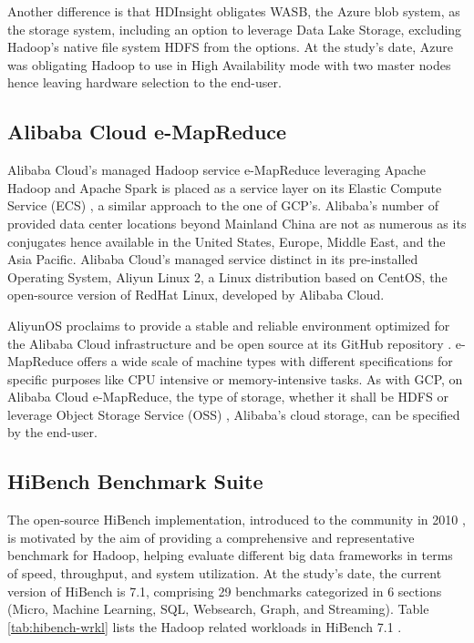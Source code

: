 \documentclass[review]{elsarticle}
\begin{document}
Another difference is that HDInsight obligates WASB, the Azure blob system, as the storage system, including an option to leverage Data Lake Storage, excluding Hadoop's native file system HDFS from the options. At the study's date, Azure was obligating Hadoop to use in High Availability mode with two master nodes hence leaving hardware selection to the end-user.

\subsection{Alibaba Cloud e-MapReduce}\label{Alibaba_eMapReduce}
Alibaba Cloud's managed Hadoop service e-MapReduce leveraging Apache Hadoop and Apache Spark is placed as a service layer on its Elastic Compute Service (ECS) \cite{noauthor_alielastic_nodate}, a similar approach to the one of GCP's. Alibaba's number of provided data center locations beyond Mainland China are not as numerous as its conjugates hence available in the United States, Europe, Middle East, and the Asia Pacific. Alibaba Cloud's managed service distinct in its pre-installed Operating System, Aliyun Linux 2, a Linux distribution based on CentOS, the open-source version of RedHat Linux, developed by Alibaba Cloud. 

AliyunOS proclaims to provide a stable and reliable environment optimized for the Alibaba Cloud infrastructure and be open source at its GitHub repository \cite{noauthor_alibaba_nodate}. e-MapReduce offers a wide scale of machine types with different specifications for specific purposes like CPU intensive or memory-intensive tasks. As with GCP, on Alibaba Cloud e-MapReduce, the type of storage, whether it shall be HDFS or leverage Object Storage Service (OSS) \cite{noauthor_oss_nodate}, Alibaba's cloud storage, can be specified by the end-user.

\subsection{HiBench Benchmark Suite}\label{benchmarks_hibench}
The open-source HiBench implementation, introduced to the community in 2010 \cite{huang_hibench_2010}, is motivated by the aim of providing a comprehensive and representative benchmark for Hadoop, helping evaluate different big data frameworks in terms of speed, throughput, and system utilization. At the study's date, the current version of HiBench is 7.1, comprising 29 benchmarks categorized in 6 sections (Micro, Machine Learning, SQL, Websearch, Graph, and Streaming). Table \ref{tab:hibench-wrkl} lists the Hadoop related workloads in HiBench 7.1 \cite{noauthor_release_nodate}. 
\end{document}
